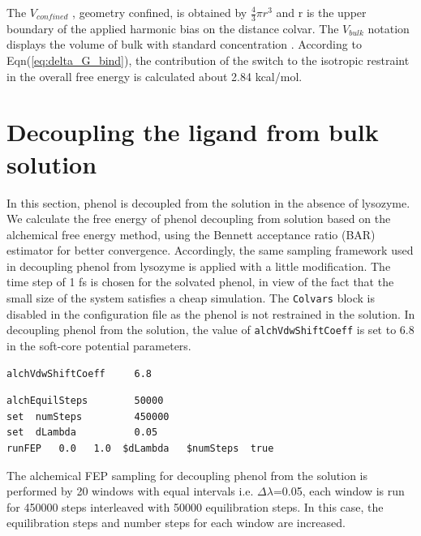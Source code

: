 \documentclass[9pt,tutorial]{livecoms}
\begin{document}
The {$V_{confined}$} , geometry confined, is obtained by {$\frac{4}{3}\pi r^{3}$} and r is the upper boundary of the applied harmonic bias on the distance colvar. The {$V_{bulk}$} notation displays the volume of bulk with standard concentration \cite{Salari2018}. According to Eqn(\ref{eq:delta_G_bind}), the contribution of the switch to the isotropic restraint in the overall free energy is calculated about 2.84 kcal/mol.

\section{Decoupling the ligand from bulk solution}\label{sec:11}

In this section, phenol is decoupled from the solution in the absence of lysozyme. We calculate the free energy of phenol decoupling from solution based on the alchemical free energy method, using the Bennett acceptance ratio (BAR) estimator for better convergence. Accordingly, the same sampling framework used in decoupling phenol from lysozyme is applied with a little modification. The time step of 1 fs is chosen for the solvated phenol, in view of the fact that the small size of the system satisfies a cheap simulation. The \texttt{Colvars} block is disabled in the configuration file as the phenol is not restrained in the solution. In decoupling phenol from the solution, the value of \texttt{alchVdwShiftCoeff} is set to 6.8 in the soft-core potential parameters. 

\begin{verbatim}
alchVdwShiftCoeff     6.8
\end{verbatim}

\begin{verbatim}
alchEquilSteps        50000
set  numSteps         450000
set  dLambda          0.05
runFEP   0.0   1.0  $dLambda   $numSteps  true
\end{verbatim}
The alchemical FEP sampling for decoupling phenol from the solution is performed by 20 windows with equal intervals i.e. {$\Delta\lambda$=0.05}, each window is run for 450000 steps interleaved with 50000 equilibration steps. In this case, the equilibration steps and number steps for each window are increased.
\end{document}
